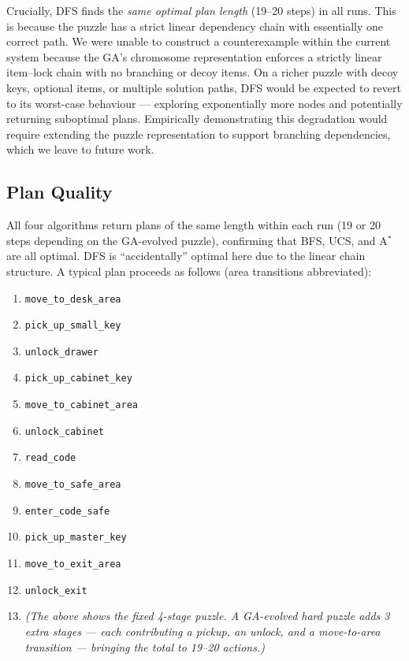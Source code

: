 \documentclass[12pt, a4paper]{report}
\begin{document}
Crucially, DFS finds the \emph{same optimal plan length} (19--20 steps) in all runs.
This is because the puzzle has a strict linear dependency chain with essentially
one correct path.  We were unable to construct a counterexample within the current system because the GA's chromosome representation enforces a strictly linear item--lock chain with no branching or decoy items.  On a richer puzzle with decoy keys, optional items, or multiple solution paths, DFS would be expected to revert to its worst-case behaviour --- exploring exponentially more nodes and potentially returning suboptimal plans.  Empirically demonstrating this degradation would require extending the puzzle representation to support branching dependencies, which we leave to future work.

\subsection{Plan Quality}

All four algorithms return plans of the same length within each run (19 or 20 steps
depending on the GA-evolved puzzle), confirming that BFS, UCS, and A$^{\ast}$ are
all optimal.  DFS is ``accidentally'' optimal here due to the linear chain structure.
A typical plan proceeds as follows (area transitions abbreviated):

\begin{enumerate}[leftmargin=1.5em,label=\arabic*.]
  \item \texttt{move\_to\_desk\_area}
  \item \texttt{pick\_up\_small\_key}
  \item \texttt{unlock\_drawer}
  \item \texttt{pick\_up\_cabinet\_key}
  \item \texttt{move\_to\_cabinet\_area}
  \item \texttt{unlock\_cabinet}
  \item \texttt{read\_code}
  \item \texttt{move\_to\_safe\_area}
  \item \texttt{enter\_code\_safe}
  \item \texttt{pick\_up\_master\_key}
  \item \texttt{move\_to\_exit\_area}
  \item \texttt{unlock\_exit}
  \item[] \textit{(The above shows the fixed 4-stage puzzle.  A GA-evolved hard
  puzzle adds 3 extra stages --- each contributing a pickup, an unlock, and a
  move-to-area transition --- bringing the total to 19--20 actions.)}
\end{enumerate}
\end{document}
